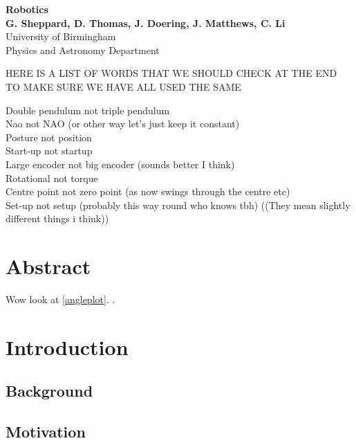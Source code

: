 \documentclass[11pt]{article}
\begin{document}
\begin{titlepage}

    \begin{center}
        \vspace*{1cm}
        \Huge
        \textbf{Robotics} \\
        \vspace{0.5cm}
        \LARGE
        \vspace{1.5cm}
        \textbf{G. Sheppard, D. Thomas, J. Doering, J. Matthews, C. Li} \\
        \vfill
        \vspace{0.8cm}
        \Large
        University of Birmingham\\
        Physics and Astronomy Department\\
    \end{center}
\end{titlepage}

\tableofcontents

HERE IS A LIST OF WORDS THAT WE SHOULD CHECK AT THE END TO MAKE SURE WE HAVE ALL USED THE SAME

Double pendulum not triple pendulum \\
Nao not NAO (or other way let's just keep it constant)\\
Posture not position\\
Start-up not startup\\
Large encoder not big encoder (sounds better I think)\\
Rotational not torque\\
Centre point not zero point (as now swings through the centre etc)\\
Set-up not setup (probably this way round who knows tbh) ((They mean slightly different things i think))


\section{Abstract}
Wow look at \ref{angleplot}. \cite{Bae2006}.

\section{Introduction}
\subsection{Background}
\subsection{Motivation}
\end{document}
